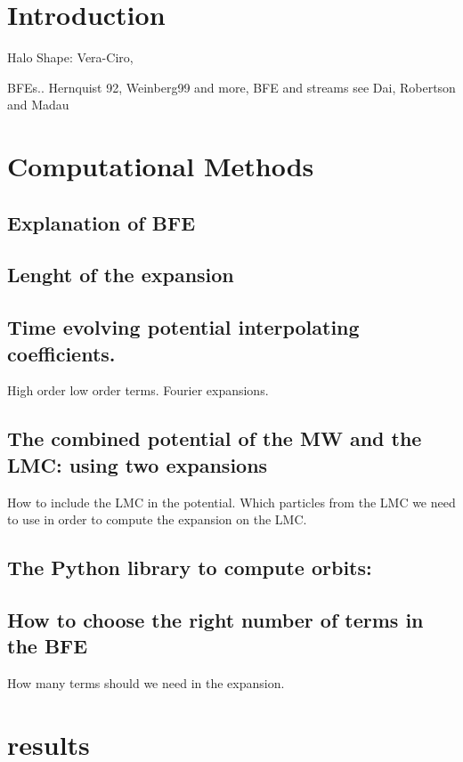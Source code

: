 \documentclass[twocolumn]{aastex62}
\begin{document}
\section{Introduction}

Halo Shape: Vera-Ciro, 

BFEs.. Hernquist 92, Weinberg99 and more, 
BFE and streams see Dai, Robertson and Madau

\section{Computational Methods}

\subsection{Explanation of BFE}


\subsection{Lenght of the expansion}


\subsection{Time evolving potential interpolating coefficients.}

High order low order terms. Fourier expansions.

\subsection{The combined potential of the MW and the LMC: using two expansions}

How to include the LMC in the potential. Which particles from the LMC we need to
use in order to compute the expansion on the LMC.

\subsection{The Python library to compute orbits:}

\subsection{How to choose the right number of terms in the BFE}

How many terms should we need in the expansion.


\section{results}
\end{document}
